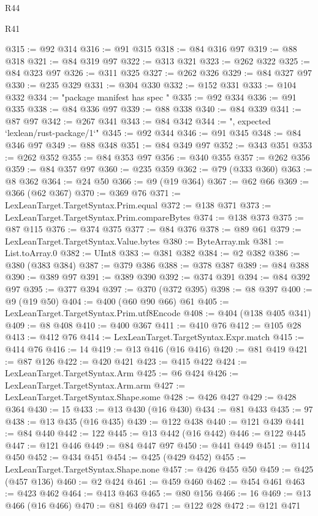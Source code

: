\begin{lexlean}{R44}
\begin{lexlean}{R41}
\begin{coremodule}
{{{{{{{{{{{{{{{{{{{{{{{{{{{{{{{{{{{{{{{{{{{{{{{{{{{{{{{{{{{{{{{{{{{{{{{{{{{{{{{{{{{{{{{@315 := @92 @314
@316 := @91 @315
@318 := @84 @316 @97
@319 := @88 @318
@321 := @84 @319 @97
@322 := @313 @321
@323 := @262 @322
@325 := @84 @323 @97
@326 := @311 @325
@327 := @262 @326
@329 := @84 @327 @97
@330 := @235 @329
@331 := @304 @330
@332 := @152 @331
@333 := @104 @332
@334 := "package manifest has spec "
@335 := @92 @334
@336 := @91 @335
@338 := @84 @336 @97
@339 := @88 @338
@340 := @84 @339
@341 := @87 @97
@342 := @267 @341
@343 := @84 @342
@344 := ", expected `lexlean/rust-package/1`"
@345 := @92 @344
@346 := @91 @345
@348 := @84 @346 @97
@349 := @88 @348
@351 := @84 @349 @97
@352 := @343 @351
@353 := @262 @352
@355 := @84 @353 @97
@356 := @340 @355
@357 := @262 @356
@359 := @84 @357 @97
@360 := @235 @359
@362 := @79 (@333 @360)
@363 := @8 @362
@364 := @24 @50
@366 := @9 (@19 @364)
@367 := @62 @66
@369 := @366 (@62 @367)
@370 := @369 @76
@371 := LexLeanTarget.TargetSyntax.Prim.equal
@372 := @138 @371
@373 := LexLeanTarget.TargetSyntax.Prim.compareBytes
@374 := @138 @373
@375 := @87 @115
@376 := @374 @375
@377 := @84 @376
@378 := @89 @61
@379 := LexLeanTarget.TargetSyntax.Value.bytes
@380 := ByteArray.mk
@381 := List.toArray.{0}
@382 := UInt8
@383 := @381 @382
@384 := @2 @382
@386 := @380 (@383 @384)
@387 := @379 @386
@388 := @378 @387
@389 := @84 @388
@390 := @389 @97
@391 := @389 @390
@392 := @374 @391
@394 := @84 @392 @97
@395 := @377 @394
@397 := @370 (@372 @395)
@398 := @8 @397
@400 := @9 (@19 @50)
@404 := @400 (@60 @90 @66) @61
@405 := LexLeanTarget.TargetSyntax.Prim.utf8Encode
@408 := @404 (@138 @405 @341)
@409 := @8 @408
@410 := @400 @367
@411 := @410 @76
@412 := @105 @28
@413 := @412 @76
@414 := LexLeanTarget.TargetSyntax.Expr.match
@415 := @414 @76
@416 := 14
@419 := @13 @416 (@16 @416)
@420 := @81 @419
@421 := @87 @126
@422 := @420 @421
@423 := @415 @422
@424 := LexLeanTarget.TargetSyntax.Arm
@425 := @6 @424
@426 := LexLeanTarget.TargetSyntax.Arm.arm
@427 := LexLeanTarget.TargetSyntax.Shape.some
@428 := @426 @427
@429 := @428 @364
@430 := 15
@433 := @13 @430 (@16 @430)
@434 := @81 @433
@435 := 97
@438 := @13 @435 (@16 @435)
@439 := @122 @438
@440 := @121 @439
@441 := @84 @440
@442 := 122
@445 := @13 @442 (@16 @442)
@446 := @122 @445
@447 := @121 @446
@449 := @84 @447 @97
@450 := @441 @449
@451 := @114 @450
@452 := @434 @451
@454 := @425 (@429 @452)
@455 := LexLeanTarget.TargetSyntax.Shape.none
@457 := @426 @455 @50
@459 := @425 (@457 @136)
@460 := @2 @424
@461 := @459 @460
@462 := @454 @461
@463 := @423 @462
@464 := @413 @463
@465 := @80 @156
@466 := 16
@469 := @13 @466 (@16 @466)
@470 := @81 @469
@471 := @122 @28
@472 := @121 @471
}}}}}}}}}}}}}}}}}}}}}}}}}}}}}}}}}}}}}}}}}}}}}}}}}}}}}}}}}}}}}}}}}}}}}}}}}}}}}}}}}}}}}}}
\end{coremodule}
\end{lexlean}
\end{lexlean}
